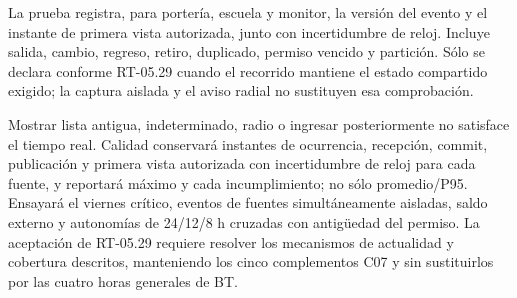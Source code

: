 La prueba registra, para portería, escuela y monitor, la versión del evento y el instante de primera vista autorizada, junto con incertidumbre de reloj. Incluye salida, cambio, regreso, retiro, duplicado, permiso vencido y partición. Sólo se declara conforme RT-05.29 cuando el recorrido mantiene el estado compartido exigido; la captura aislada y el aviso radial no sustituyen esa comprobación.

Mostrar lista antigua, indeterminado, radio o ingresar posteriormente no satisface el tiempo real. Calidad conservará instantes de ocurrencia, recepción, commit, publicación y primera vista autorizada con incertidumbre de reloj para cada fuente, y reportará máximo y cada incumplimiento; no sólo promedio/P95. Ensayará el viernes crítico, eventos de fuentes simultáneamente aisladas, saldo externo y autonomías de 24/12/8 h cruzadas con antigüedad del permiso. La aceptación de RT-05.29 requiere resolver los mecanismos de actualidad y cobertura descritos, manteniendo los cinco complementos C07 y sin sustituirlos por las cuatro horas generales de BT.
